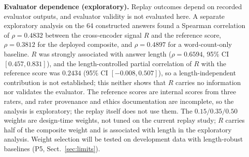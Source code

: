\documentclass[runningheads,a4paper]{llncs}
\begin{document}
\textbf{Evaluator dependence (exploratory).} Replay outcomes depend on recorded evaluator outputs, and evaluator validity is not evaluated here. A separate exploratory analysis on the 64 constructed answers found a Spearman correlation of $\rho=0.4832$ between the cross-encoder signal $R$ and the reference score, $\rho=0.3812$ for the deployed composite, and $\rho=0.4897$ for a word-count-only baseline. $R$ was strongly associated with answer length ($\rho=0.6594$, 95\% CI $[0.457,0.831]$), and the length-controlled partial correlation of $R$ with the reference score was $0.2434$ (95\% CI $[-0.008,0.507]$), so a length-independent contribution is not established; this neither shows that $R$ carries no information nor validates the evaluator. The reference scores are internal scores from three raters, and rater provenance and ethics documentation are incomplete, so the analysis is exploratory; the replay itself does not use them. The $0.15/0.35/0.50$ weights are design-time weights, not tuned on the current replay study; $R$ carries half of the composite weight and is associated with length in the exploratory analysis. Weight selection will be tested on development data with length-robust baselines (P5, Sect.~\ref{sec:limits}).
\end{document}
